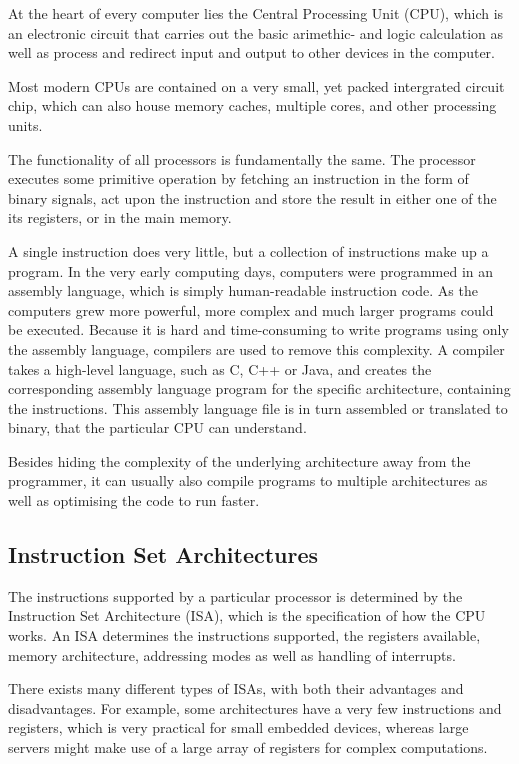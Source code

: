 At the heart of every computer lies the Central Processing Unit (CPU),
which is
an electronic circuit that carries out the basic arimethic- and logic
calculation as well as process and redirect input and output to other devices
in the computer.

Most modern CPUs are contained on a very small, yet packed intergrated circuit
chip, which can also house memory caches, multiple cores, and other processing
units.

The functionality of all processors is fundamentally the same. The processor
executes some primitive operation by fetching an instruction in the form of
binary signals, act upon the instruction and store the result in either
one of the its registers, or in the main memory.

A single instruction does very little, but a collection of instructions make up
a program. In the very early computing days, computers were programmed in an
assembly language, which is simply human-readable instruction code. As the
computers grew more powerful, more complex and much larger programs could be
executed. Because it is hard and time-consuming to write programs using only the
assembly language, compilers are used to remove this complexity. A
compiler takes a high-level language, such as C, C++ or Java, and creates the
corresponding assembly language program for the specific architecture,
containing the instructions. This assembly language file is in turn assembled
or translated to binary, that the particular CPU can understand.

Besides hiding the complexity of the underlying architecture away from the
programmer, it can usually also compile programs to multiple architectures as
well as optimising the code to run faster.

\subsection{Instruction Set Architectures}
The instructions supported by a particular processor is determined by the
Instruction Set Architecture (ISA), which is the specification of how the CPU
works. An ISA determines the instructions
supported, the registers available, memory architecture, addressing modes as
well as handling of interrupts.

There exists many different types of ISAs, with both their advantages and
disadvantages. For example, some architectures have a very few instructions
and registers, which is very practical for small embedded devices, whereas large
servers might make use of a large array of registers for complex computations.

